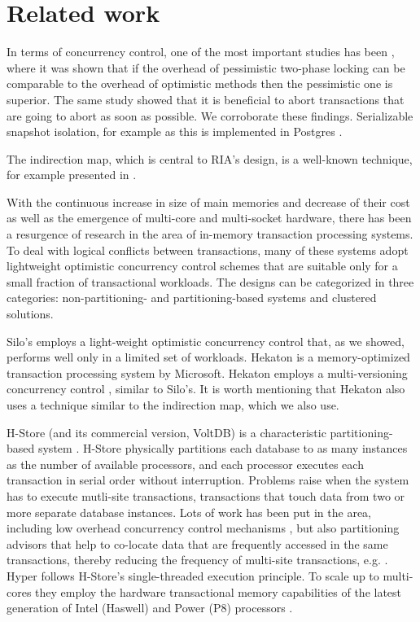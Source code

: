 
\section{Related work}

In terms of concurrency control, one of the most important studies has been \cite{AgrawalCL87}, where it was shown that if the overhead of pessimistic two-phase locking can be comparable to the overhead of optimistic methods then the pessimistic one is superior. The same study showed that it is beneficial to abort transactions that are going to abort as soon as possible. We corroborate these findings. 
Serializable snapshot isolation, for example as this is implemented in Postgres \cite{PortsG12}. 
 
The indirection map, which is central to RIA's design, is a well-known technique, for example presented in \cite{SadoghiRCB13}.

With the continuous increase in size of main memories and decrease of their cost as well as the emergence of multi-core and multi-socket hardware, there has been a resurgence of research in the area of in-memory transaction processing systems.  
To deal with logical conflicts between transactions, many of these systems adopt lightweight optimistic concurrency control schemes that are suitable only for a small fraction of transactional workloads.
The designs can be categorized in three categories: non-partitioning- and partitioning-based systems and clustered solutions. 

Silo's  \cite{TuZKLM13} employs a light-weight optimistic concurrency control that, as we showed, performs well only in a limited set of workloads. 
Hekaton \cite{Diaconu+13} is a memory-optimized transaction processing system by Microsoft. Hekaton employs a multi-versioning concurrency control \cite{LarsonBDFPZ11}, similar to Silo's. It is worth mentioning that Hekaton also uses a technique similar to the indirection map, which we also use. 


H-Store (and its commercial version, VoltDB) is a characteristic partitioning-based system \cite{Kallman+08}. H-Store physically partitions each database to as many instances as the number of available processors, and each processor executes each transaction in serial order without interruption.  
Problems raise when the system has to execute mutli-site transactions, transactions that touch data from two or more separate database instances. Lots of work has been put in the area, including low overhead concurrency control mechanisms \cite{JonesAM10}, but also partitioning advisors that help to co-locate data that are frequently accessed in the same transactions, thereby reducing the frequency of multi-site transactions, e.g. \cite{CurinoJZM10,PavloJZ11,TranNST14}.
Hyper \cite{KemperN11} follows H-Store's single-threaded execution principle.  To scale up to multi-cores they employ the hardware transactional memory capabilities of the latest generation of Intel (Haswell) and Power (P8) processors \cite{LeisKN14}. 

